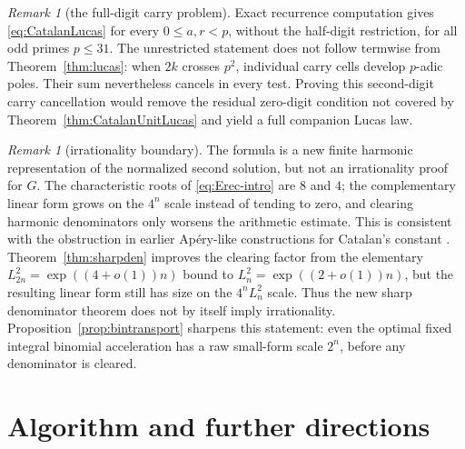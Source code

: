 \documentclass[11pt]{article}
\theoremstyle{definition}
\theoremstyle{remark}
\newtheorem{remark}[theorem]{Remark}
\begin{document}
\begin{remark}[the full-digit carry problem]\label{rem:fullLucas}
Exact recurrence computation gives \eqref{eq:CatalanLucas} for every
$0\le a,r<p$, without the half-digit restriction, for all odd primes $p\le31$.
The unrestricted statement does not follow termwise from
Theorem~\ref{thm:lucas}: when $2k$ crosses $p^2$, individual carry cells develop
$p$-adic poles.  Their sum nevertheless cancels in every test.  Proving this
second-digit carry cancellation would remove the residual zero-digit condition not
covered by Theorem~\ref{thm:CatalanUnitLucas} and yield a full companion Lucas law.
\end{remark}

\begin{remark}[irrationality boundary]
The formula is a new finite harmonic representation of the normalized second solution,
but not an irrationality proof for $G$.  The characteristic roots of
\eqref{eq:Erec-intro} are $8$ and $4$; the complementary linear form grows on the
$4^n$ scale instead of tending to zero, and clearing harmonic denominators only worsens
the arithmetic estimate.  This is consistent with the obstruction in earlier
Ap\'ery-like constructions for Catalan's constant \cite{ZudilinCatalanRemarks}.
Theorem~\ref{thm:sharpden} improves the clearing factor from the elementary
$L_{2n}^2=\exp((4+o(1))n)$ bound to $L_n^2=\exp((2+o(1))n)$, but the resulting
linear form still has size on the $4^nL_n^2$ scale.  Thus the new sharp denominator
theorem does not by itself imply irrationality.  Proposition~\ref{prop:bintransport}
sharpens this statement: even the optimal fixed integral binomial acceleration has a
raw small-form scale $2^n$, before any denominator is cleared.
\end{remark}

\section{Algorithm and further directions}
\end{document}

